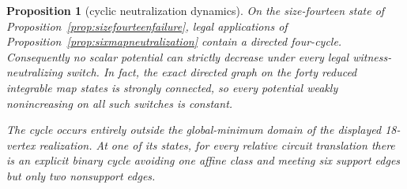 \documentclass[11pt]{article}
\newtheorem{proposition}[theorem]{Proposition}
\theoremstyle{definition}
\theoremstyle{remark}
\begin{document}
\begin{proposition}[cyclic neutralization dynamics]
\label{prop:neutralizationcycle}
On the size-fourteen state of
Proposition~\ref{prop:sizefourteenfailure}, legal applications of
Proposition~\ref{prop:sixmapneutralization} contain a directed four-cycle.
Consequently no scalar potential can strictly decrease under every legal
witness-neutralizing switch.  In fact, the exact directed graph on the
forty reduced integrable map states is strongly connected, so every
potential weakly nonincreasing on all such switches is constant.

The cycle occurs entirely outside the global-minimum domain of the
displayed 18-vertex realization.  At one of its states, for every relative
circuit translation there is an explicit binary cycle avoiding one affine
class and meeting six support edges but only two nonsupport edges.
\end{proposition}
\end{document}
